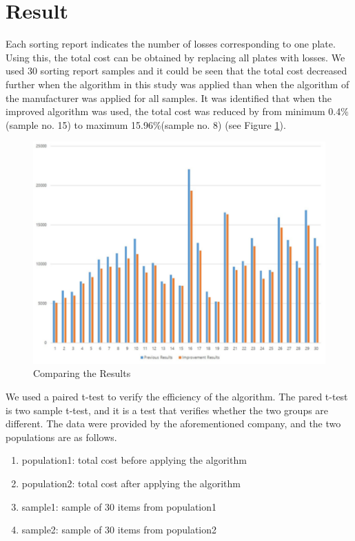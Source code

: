 \section{Result}\label{sec:Result}

Each sorting report indicates the number of losses corresponding to one plate. 
Using this, the total cost can be obtained by replacing all plates with losses. 
We used 30 sorting report samples and it could be seen that the total cost decreased further 
when the algorithm in this study was applied than when the algorithm of the manufacturer was applied for all samples. 
It was identified that when the improved algorithm was used, the total cost was reduced by from minimum 0.4\%(sample no. 15) to maximum 15.96\%(sample no. 8) (see Figure \ref{fig:Comparing}).

\begin{figure}[h!]
	\centering
	\includegraphics[width=\linewidth]{Comparing.pdf}
	\caption{Comparing the Results}
	\label{fig:Comparing}       %
\end{figure}

We used a paired t-test to verify the efficiency of the algorithm. The pared t-test is two sample t-test, and it is a test that verifies whether the two groups are different. The data were provided by the aforementioned company, and the two populations are as follows.

\begin{enumerate}[$\bullet$]
	\item population1: total cost before applying the algorithm
	\item population2: total cost after applying the algorithm
	\item sample1: sample of 30 items from population1
	\item sample2: sample of 30 items from population2
\end{enumerate}

